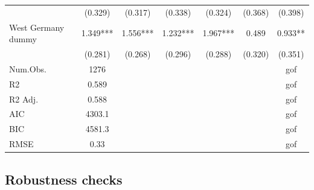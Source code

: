 \documentclass[
]{article}
\begin{document}
\begin{table}[!h]
{\begin{tabular}[t]{lcccccc}
 & (\num{0.329}) & (\num{0.317}) & (\num{0.338}) & (\num{0.324}) & (\num{0.368}) & (\num{0.398})\\
West Germany dummy & \num{1.349}*** & \num{1.556}*** & \num{1.232}*** & \num{1.967}*** & \num{0.489} & \num{0.933}**\\
 & (\num{0.281}) & (\num{0.268}) & (\num{0.296}) & (\num{0.288}) & (\num{0.320}) & (\num{0.351})\\
Num.Obs. & \num{1276} &  &  &  &  & gof\\
R2 & \num{0.589} &  &  &  &  & gof\\
R2 Adj. & \num{0.588} &  &  &  &  & gof\\
AIC & \num{4303.1} &  &  &  &  & gof\\
BIC & \num{4581.3} &  &  &  &  & gof\\
RMSE & \num{0.33} &  &  &  &  & gof\\
\bottomrule
\end{tabular}}
\end{table}

\FloatBarrier

\hypertarget{robustness-checks}{%
\subsection{Robustness checks}\label{robustness-checks}}
\end{document}
